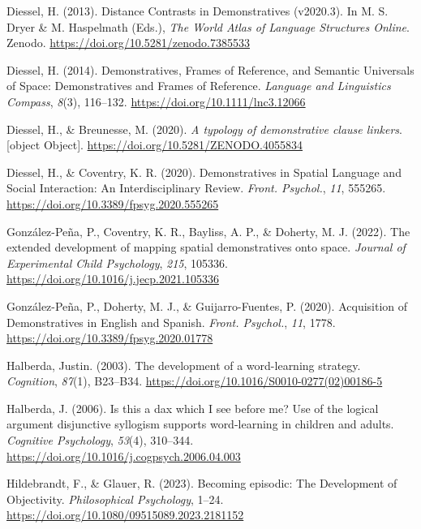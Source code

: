 \documentclass[
  man,floatsintext]{apa6}
\newlength{\cslhangindent}
\newenvironment{CSLReferences}[2] %
 {\begin{list}{}{%
  \setlength{\itemindent}{0pt}
  \setlength{\leftmargin}{0pt}
  \setlength{\parsep}{0pt}
  \ifodd #1
   \setlength{\leftmargin}{\cslhangindent}
   \setlength{\itemindent}{-1\cslhangindent}
  \fi
  \setlength{\itemsep}{#2\baselineskip}}}
 {\end{list}}
\begin{document}
\begin{CSLReferences}{1}{0}
Diessel, H. (2013). Distance {Contrasts} in {Demonstratives} (v2020.3). In M. S. Dryer \& M. Haspelmath (Eds.), \emph{The {World} {Atlas} of {Language} {Structures} {Online}}. Zenodo. \url{https://doi.org/10.5281/zenodo.7385533}

Diessel, H. (2014). Demonstratives, {Frames} of {Reference}, and {Semantic} {Universals} of {Space}: {Demonstratives} and {Frames} of {Reference}. \emph{Language and Linguistics Compass}, \emph{8}(3), 116--132. \url{https://doi.org/10.1111/lnc3.12066}

Diessel, H., \& Breunesse, M. (2020). \emph{A typology of demonstrative clause linkers}. {[}object Object{]}. \url{https://doi.org/10.5281/ZENODO.4055834}

Diessel, H., \& Coventry, K. R. (2020). Demonstratives in {Spatial} {Language} and {Social} {Interaction}: {An} {Interdisciplinary} {Review}. \emph{Front. Psychol.}, \emph{11}, 555265. \url{https://doi.org/10.3389/fpsyg.2020.555265}

González-Peña, P., Coventry, K. R., Bayliss, A. P., \& Doherty, M. J. (2022). The extended development of mapping spatial demonstratives onto space. \emph{Journal of Experimental Child Psychology}, \emph{215}, 105336. \url{https://doi.org/10.1016/j.jecp.2021.105336}

González-Peña, P., Doherty, M. J., \& Guijarro-Fuentes, P. (2020). Acquisition of {Demonstratives} in {English} and {Spanish}. \emph{Front. Psychol.}, \emph{11}, 1778. \url{https://doi.org/10.3389/fpsyg.2020.01778}

Halberda, Justin. (2003). The development of a word-learning strategy. \emph{Cognition}, \emph{87}(1), B23--B34. \url{https://doi.org/10.1016/S0010-0277(02)00186-5}

Halberda, J. (2006). Is this a dax which {I} see before me? {Use} of the logical argument disjunctive syllogism supports word-learning in children and adults. \emph{Cognitive Psychology}, \emph{53}(4), 310--344. \url{https://doi.org/10.1016/j.cogpsych.2006.04.003}

Hildebrandt, F., \& Glauer, R. (2023). Becoming episodic: {The} {Development} of {Objectivity}. \emph{Philosophical Psychology}, 1--24. \url{https://doi.org/10.1080/09515089.2023.2181152}


\end{CSLReferences}
\end{document}
